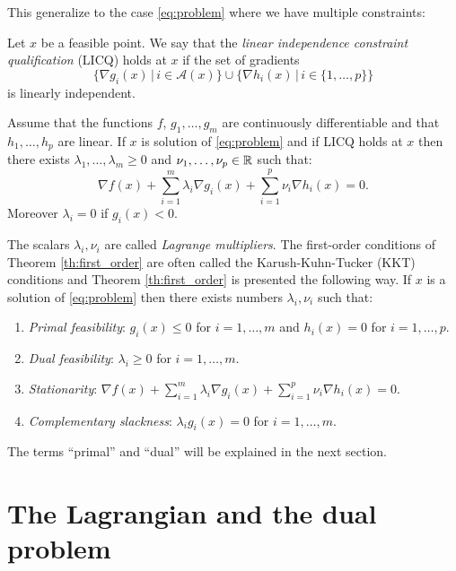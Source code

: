 \documentclass[11pt,nocut]{article}
\begin{document}
This generalize to the case \eqref{eq:problem} where we have multiple constraints:

\begin{definition}[LICQ]
	Let $x$ be a feasible point. We say that the \emph{linear independence constraint qualification} (LICQ) holds at $x$ if the set of gradients
	$$
	\big\{ \nabla g_i(x) \, \big| \, i \in \mathcal{A}(x) \big\}
	\cup
	\big\{ \nabla h_i(x) \, \big| \, i \in \{1, \dots, p\} \big\}
	$$
	is linearly independent.
\end{definition}

\begin{theorem}\label{th:first_order}
	Assume that the functions $f$, $g_1, \dots, g_m$ are continuously differentiable and that $h_1, \dots, h_p$ are linear. If $x$ is solution of \eqref{eq:problem} and if LICQ holds at $x$
	then there exists $\lambda_1, \dots, \lambda_m \geq 0$ and $\nu_1, \dots, \nu_p \in \mathbb{R}$ such that:
	\begin{equation}\label{eq:kkt}
		\nabla f(x) + \sum_{i=1}^m \lambda_i \nabla g_i(x) + \sum_{i=1}^p \nu_i \nabla h_i(x) = 0.
	\end{equation}
	Moreover $\lambda_i = 0$ if $g_i(x) < 0$.
\end{theorem}

The scalars $\lambda_i, \nu_i$ are called \emph{Lagrange multipliers}.
The first-order conditions of Theorem \ref{th:first_order} are often called the Karush-Kuhn-Tucker (KKT) conditions and Theorem \ref{th:first_order} is presented the following way.
If $x$ is a solution of \eqref{eq:problem} then there exists numbers $\lambda_i,\nu_i$ such that:
\begin{enumerate}[label=(\roman*)]
	\item\label{item:kkt1} \emph{Primal feasibility}: $g_i(x) \leq 0$ for $i=1, \dots, m$ and $h_i(x) = 0$ for $i=1, \dots, p$.
	\item\label{item:kkt2} \emph{Dual feasibility}: $\lambda_i \geq 0$ for $i=1, \dots, m$.
	\item\label{item:kkt3} \emph{Stationarity}: $\nabla f(x) + \sum\limits_{i=1}^m \lambda_i \nabla g_i(x) + \sum\limits_{i=1}^p \nu_i \nabla h_i(x) = 0$.
	\item\label{item:kkt4} \emph{Complementary slackness}: $\lambda_i g_i(x) = 0$ for $i = 1 ,\dots, m$.
\end{enumerate}
The terms ``primal'' and ``dual'' will be explained in the next section.

\section{The Lagrangian and the dual problem}
\end{document}
